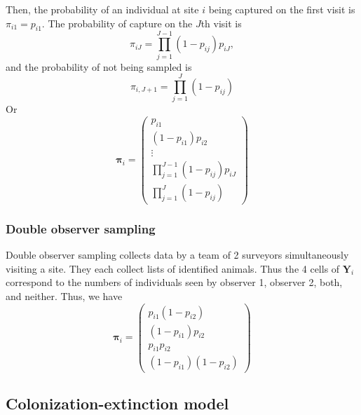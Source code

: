 Then, the probability of an individual at site $i$ being captured on the first
visit is $\pi_{i1} = p_{i1}$.  The probability of capture on the $J$th visit is
\begin{equation}
  \pi_{iJ} = \prod_{j=1}^{J-1}(1-p_{ij})p_{iJ},
\end{equation}
and the probability of not being sampled is
\begin{equation}
  \pi_{i,J+1} = \prod_{j=1}^{J}(1-p_{ij})
\end{equation}
Or
\begin{equation}
  \bm \pi_i =
  \begin{pmatrix}
    p_{i1} \\
    (1-p_{i1})p_{i2} \\
    \vdots \\
    \prod_{j=1}^{J-1}(1-p_{ij})p_{iJ} \\
     \prod_{j=1}^{J}(1-p_{ij})
  \end{pmatrix}
\end{equation}

\subsubsection{Double observer sampling}

Double observer sampling collects data by a team of 2 surveyors
simultaneously visiting a site.  They each collect lists of identified
animals.  Thus the 4 cells of $\bm Y_i$ correspond to the numbers of
individuals seen by observer 1, observer 2, both, and neither.  Thus,
we have
\begin{equation}
  \bm \pi_i =
  \begin{pmatrix}
    p_{i1}(1-p_{i2}) \\
    (1-p_{i1})p_{i2} \\
    p_{i1}p_{i2} \\
    (1-p_{i1})(1-p_{i2})
  \end{pmatrix}
\end{equation}

\citep{royle_modeling_2004}

\subsection{Colonization-extinction model}

